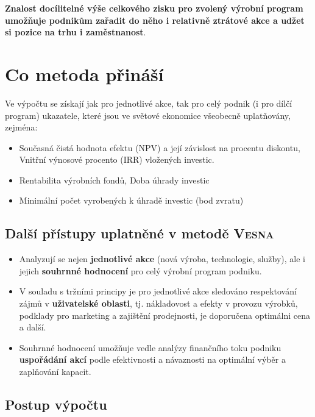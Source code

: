 \documentclass [10pt, fancyhdr, twoside] {article}
\begin{document}
\textbf{Znalost docílitelné výše celkového zisku pro zvolený výrobní program umožňuje podnikům zařadit do něho i relativně ztrátové akce a udžet si pozice na trhu i zaměstnanost}.

\section{Co metoda přináší}

Ve výpočtu se získají jak pro jednotlivé akce, tak pro celý podnik (i pro dílčí program) ukazatele, které jsou ve světové ekonomice všeobecně uplatňovány, zejména:

\begin{itemize}[label=\NibRight]
\item Současná čistá hodnota efektu (NPV) a její závislost na procentu diskontu, Vnitřní výnosové procento (IRR) vložených investic.
\item Rentabilita výrobních fondů, Doba úhrady investic
\item Minimální počet vyrobených k úhradě investic (bod zvratu)
\end{itemize}

\subsection{Další přístupy uplatněné v metodě \textsc{Vesna}}

\begin{itemize}
\item Analyzují se nejen \textbf{jednotlivé akce} (nová výroba, technologie, služby), ale i jejich \textbf{souhrnné hodnocení} pro celý výrobní program podniku.
\item V souladu s tržními principy je pro jednotlivé akce sledováno respektování zájmů v \textbf{uživatelské oblasti}, tj. nákladovost a efekty v provozu výrobků, podklady pro marketing a zajištění prodejnosti, je doporučena optimálni cena a další.
\item Souhrnné hodnocení umožňuje vedle analýzy finančního toku podniku \textbf{uspořádání akcí} podle efektivnosti a návaznosti na optimální výběr a zaplňování kapacit.
\end{itemize}

\subsection{Postup výpočtu}
\end{document}
